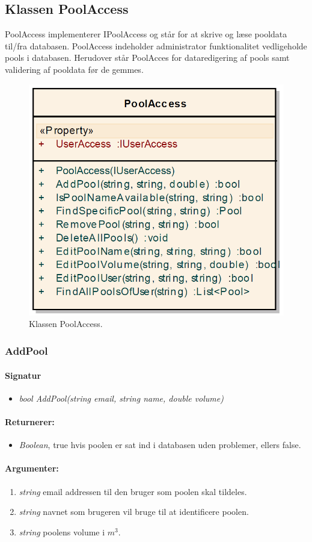\subsection{Klassen PoolAccess}
PoolAccess implementerer IPoolAccess og står for at skrive og læse pooldata til/fra databasen. PoolAccess indeholder administrator funktionalitet vedligeholde pools i databasen. Herudover står PoolAcces for dataredigering af pools samt validering af pooldata før de gemmes.

\begin{figure}
\centering
\includegraphics[width=0.46\linewidth]{figs/implementering/poolAccessClass.PNG}
\caption{Klassen PoolAccess.}
\label{fig:poolAccessClass}
\end{figure}

\subsubsection{AddPool}%

\paragraph{Signatur}
\begin{itemize}
	\item \textit{bool AddPool(string email, string name, double volume)}
\end{itemize}

\paragraph{Returnerer:}
\begin{itemize}
	\item \textit{Boolean}, true hvis poolen er sat ind i databasen uden problemer, ellers false.
\end{itemize}

\paragraph{Argumenter:}
\begin{enumerate}
	\item \textit{string} email addressen til den bruger som poolen skal tildeles.
	\item \textit{string} navnet som brugeren vil bruge til at identificere poolen.
	\item \textit{string} poolens volume i $m^3$.
\end{enumerate}

